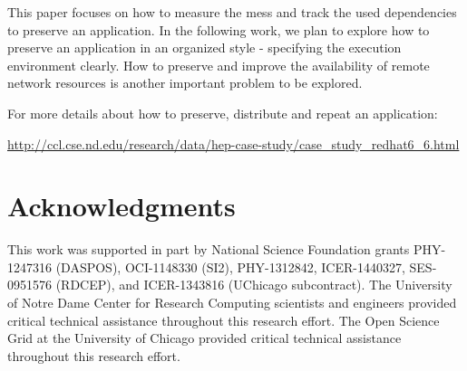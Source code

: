 \documentclass[procedia]{easychair}
\begin{document}
This paper focuses on how to measure the mess and track the used dependencies to preserve an application.
In the following work, we plan to explore how to preserve an application in an organized style - specifying the execution environment clearly.
How to preserve and improve the availability of remote network resources is another important problem to be explored.

For more details about how to preserve, distribute and repeat an application: 

\url{http://ccl.cse.nd.edu/research/data/hep-case-study/case\_study\_redhat6\_6.html}
\small
\vspace{-25pt}
\section*{Acknowledgments}

This work was supported in part by National Science Foundation grants PHY-1247316 (DASPOS), 
OCI-1148330 (SI2), PHY-1312842, ICER-1440327, SES-0951576 (RDCEP), and ICER-1343816 (UChicago subcontract).
The University of Notre Dame Center for Research Computing scientists and engineers provided critical technical assistance throughout this research effort.
The Open Science Grid at the University of Chicago provided critical technical assistance throughout this research effort.

\vspace{-20pt}


\end{document}
